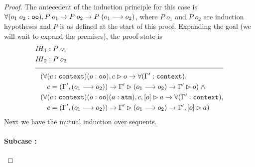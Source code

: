 \begin{proof}
The antecedent of the  induction principle for this case is $\forall (o_1 \; o_2 : \texttt{oo}), P \; o_1 \rightarrow P \; o_2 \rightarrow P \; (o_1 \longrightarrow o_2)$, where $P \; o_1$ and $P \; o_2$ are induction hypotheses and $P$ is as defined at the start of this proof. Expanding the goal (we will wait to expand the premises), the proof state is
\begin{align*}
\mathit{IH}_1 &: P \; o_1 \\
\mathit{IH}_2 &: P \; o_2 \\[\pfshift{}]
\cline{1-2}
(\forall & (c : \sltm{context}) (o : \sltm{oo}), \seqsl[c]{o} \rightarrow \forall (\inddyncon{} : \sltm{context}), \\
& c = (\inddyncon{}, (o_1 \longrightarrow o_2)) \rightarrow \seqsl[\inddyncon{}]{(o_1 \longrightarrow o_2)} \rightarrow \seqsl[\inddyncon{}]{o}) \; \wedge \\
(\forall & (c : \sltm{context}) (o : \sltm{oo}) (a : \sltm{atm}), \bchsl[c]{o}{a} \rightarrow \forall (\inddyncon{} : \sltm{context}), \\
& c = (\inddyncon{}, (o_1 \longrightarrow o_2)) \rightarrow \seqsl[\inddyncon{}]{(o_1 \longrightarrow o_2)} \rightarrow \bchsl[\inddyncon{}]{o}{a})
\end{align*}
Next we have the mutual induction over sequents.

\paragraph{Subcase \rlnmsinit{} :}


\end{proof}
